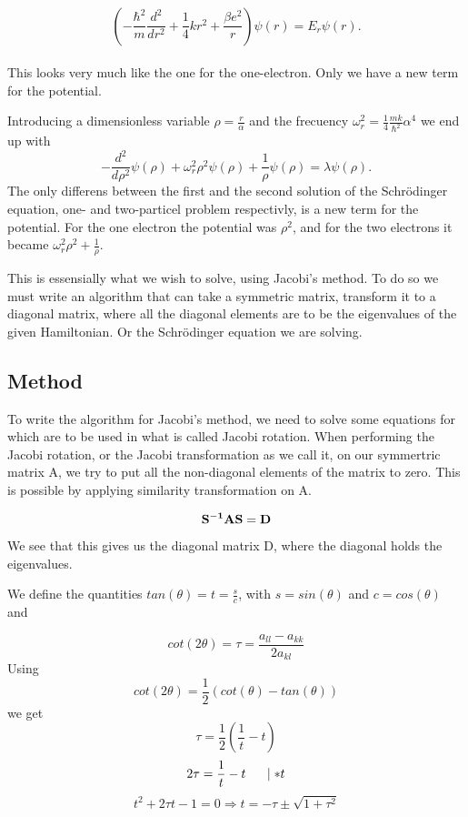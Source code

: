 \documentclass[a4paper,12pt, english]{article}
\begin{document}
\\
$$\left(  -\frac{\hbar^2}{m} \frac{d^2}{dr^2}+ \frac{1}{4}k r^2+\frac{\beta e^2}{r}\right)\psi(r)  = E_r \psi(r).$$
\\
This looks very much like the one for the one-electron. Only we have a new term for the potential.

Introducing a dimensionless variable $\rho = \frac{r}{\alpha}$ and the frecuency $\omega_r^2 = \frac{1}{4}\frac{mk}{\hbar^2}\alpha^4$ we end up with 
$$-\frac{d^2}{d\rho^2} \psi(\rho) + \omega_r^2\rho^2\psi(\rho) +\frac{1}{\rho}\psi(\rho) = \lambda \psi(\rho).$$
The only differens between the first and the second solution of the Schr\"odinger equation, one-  and two-particel problem respectivly, is a new term for the potential.
For the one electron the potential was $\rho^2$, and for the two electrons it became $\omega_r^2\rho^2 + \frac{1}{\rho}$.

This is essensially what we wish to solve, using Jacobi's method.
To do so we must write an algorithm that can take a symmetric matrix, transform it to a diagonal matrix, where all the diagonal elements are to be the eigenvalues of the given Hamiltonian. Or the Schr\"odinger equation we are solving. 


\subsection{Method}

To write the algorithm for Jacobi's method, we need to solve some equations for which are to be used in what is called Jacobi rotation. When performing the Jacobi rotation, or the Jacobi transformation as we call it, on our symmertric matrix A, we try to put all the non-diagonal elements of the matrix to zero. This is possible by applying similarity transformation on A. 

$${\bf S^{-1}}{\bf A}{\bf S} = {\bf D}$$


We see that this gives us the diagonal matrix D, where the diagonal holds the eigenvalues.


We define the quantities $tan(\theta) = t = \frac{s}{c}$, with $s=sin(\theta)$ and $c = cos(\theta)$ and 

$$cot(2\theta) = \tau = \frac{a_{ll}- a_{kk}}{2a_{kl}} $$ 
Using $$cot(2\theta) = \frac{1}{2}(cot(\theta) - tan(\theta))$$ we get 
$$\tau = \frac{1}{2}(\frac{1}{t} -t) $$
$$2\tau = \frac{1}{t} - t \hspace{5mm} \mid *t $$
$$t^2 + 2\tau t - 1 = 0 \Rightarrow t = -\tau \pm \sqrt{1+\tau^2} $$
\end{document}
